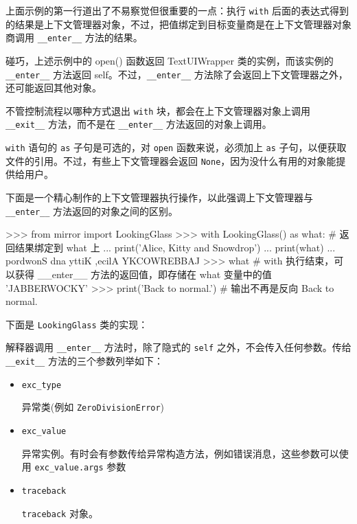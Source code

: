上面示例的第一行道出了不易察觉但很重要的一点：执行 \texttt{with} 后面的表达式得到的结果是上下文管理器对象，不过，把值绑定到目标变量商是在上下文管理器对象商调用 \texttt{\_\_enter\_\_} 方法的结果。

碰巧，上述示例中的 open() 函数返回 TextUIWrapper 类的实例，而该实例的 \texttt{\_\_enter\_\_} 方法返回 self。不过，\texttt{\_\_enter\_\_} 方法除了会返回上下文管理器之外，还可能返回其他对象。

不管控制流程以哪种方式退出 \texttt{with} 块，都会在上下文管理器对象上调用 \texttt{\_\_exit\_\_} 方法，而不是在 \texttt{\_\_enter\_\_} 方法返回的对象上调用。

\texttt{with} 语句的 \texttt{as} 子句是可选的，对 \texttt{open} 函数来说，必须加上 \texttt{as} 子句，以便获取文件的引用。不过，有些上下文管理器会返回 \texttt{None}，因为没什么有用的对象能提供给用户。

下面是一个精心制作的上下文管理器执行操作，以此强调上下文管理器与 \texttt{\_\_enter\_\_} 方法返回的对象之间的区别。

\begin{python}
>>> from mirror import LookingGlass
>>> with LookingGlass() as what:    # 返回结果绑定到 what 上
...     print('Alice, Kitty and Snowdrop')
...     print(what) 
... 
pordwonS dna yttiK ,ecilA
YKCOWREBBAJ
>>> what    # with 执行结束，可以获得 __enter__ 方法的返回值，即存储在 what 变量中的值
'JABBERWOCKY'
>>> print('Back to normal.')    # 输出不再是反向
Back to normal.
\end{python}

下面是 \texttt{LookingGlass} 类的实现：



解释器调用 \texttt{\_\_enter\_\_} 方法时，除了隐式的 \texttt{self} 之外，不会传入任何参数。传给 \texttt{\_\_exit\_\_} 方法的三个参数列举如下：

\begin{itemize}
    \item \texttt{exc\_type}
    
    异常类(例如 \texttt{ZeroDivisionError})

    \item \texttt{exc\_value}
    
    异常实例。有时会有参数传给异常构造方法，例如错误消息，这些参数可以使用 \texttt{exc\_value.args} 参数

    \item \texttt{traceback}
    
    \texttt{traceback} 对象。
\end{itemize}

